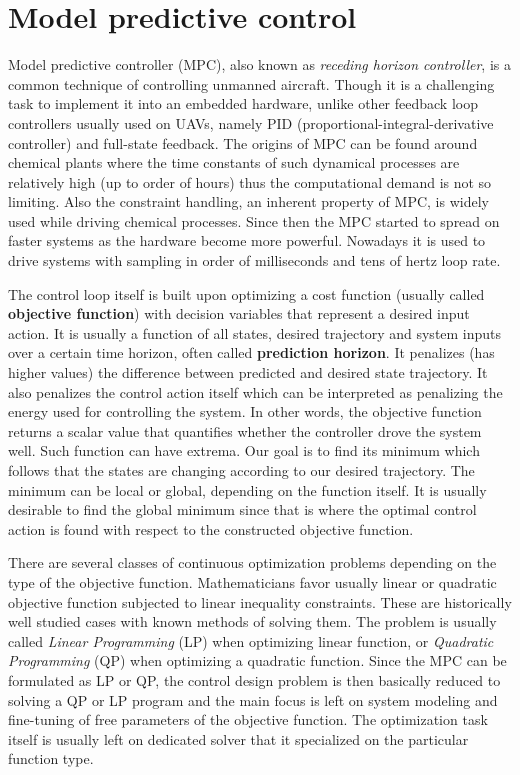 \section{Model predictive control}

Model predictive controller (MPC), also known as \textit{receding horizon controller}, is a common technique of controlling unmanned aircraft. Though it is a challenging task to implement it into an embedded hardware, unlike other feedback loop controllers usually used on UAVs, namely PID (proportional-integral-derivative controller) and full-state feedback. The origins of MPC can be found around chemical plants where the time constants of such dynamical processes are relatively high (up to order of hours) thus the computational demand is not so limiting. Also the constraint handling, an inherent property of MPC, is widely used while driving chemical processes. Since then the MPC started to spread on faster systems as the hardware become more powerful. Nowadays it is used to drive systems with sampling in order of milliseconds and tens of hertz loop rate.

The control loop itself is built upon optimizing a cost function (usually called \textbf{objective function}) with decision variables that represent a desired input action. It is usually a function of all states, desired trajectory and system inputs over a certain time horizon, often called \textbf{prediction horizon}. It penalizes (has higher values) the difference between predicted and desired state trajectory. It also penalizes the control action itself which can be interpreted as penalizing the energy used for controlling the system. In other words, the objective function returns a scalar value that quantifies whether the controller drove the system well. Such function can have extrema. Our goal is to find its minimum which follows that the states are changing according to our desired trajectory. The minimum can be local or global, depending on the function itself. It is usually desirable to find the global minimum since that is where the optimal control action is found with respect to the constructed objective function.

There are several classes of continuous optimization problems depending on the type of the objective function. Mathematicians favor usually linear or quadratic objective function subjected to linear inequality constraints. These are historically well studied cases with known methods of solving them. The problem is usually called \textit{Linear Programming} (LP) when optimizing linear function, or \textit{Quadratic Programming} (QP) when optimizing a quadratic function. Since the MPC can be formulated as LP or QP, the control design problem is then basically reduced to solving a QP or LP program and the main focus is left on system modeling and fine-tuning of free parameters of the objective function. The optimization task itself is usually left on dedicated solver that it specialized on the particular function type. 


